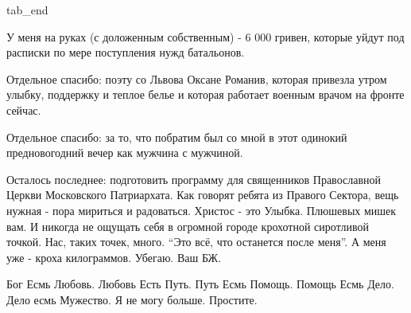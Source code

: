   tab_end
\fi

У меня на руках (с доложенным собственным) - 6 000 гривен, которые уйдут под
расписки по мере поступления нужд батальонов. 

Отдельное спасибо: поэту со Львова Оксане Романив, которая привезла утром
улыбку, поддержку и теплое белье и которая работает военным врачом на фронте
сейчас.

Отдельное спасибо: за то, что побратим был со мной в этот одинокий
предновогодний вечер как мужчина с мужчиной. 

Осталось последнее: подготовить программу для священников Православной Церкви
Московского Патриархата. Как говорят ребята из Правого Сектора, вещь нужная -
пора мириться и радоваться. Христос - это Улыбка. Плюшевых мишек вам. И никогда
не ощущать себя в огромной городе крохотной сиротливой точкой. Нас, таких
точек, много. \enquote{Это всё, что останется после меня}. А меня уже - кроха
килограммов. Убегаю. Ваш БЖ.

Бог Есмь Любовь. Любовь Есть Путь. Путь Есмь Помощь. Помощь Есмь Дело. Дело
есмь Мужество. Я не могу больше. Простите.




